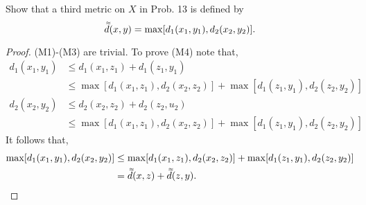 \documentclass[12pt]{article}
\newcommand{\dbtilde}[1]{\accentset{\approx}{#1}}
\newenvironment{exercise}[2][Exercise]{\begin{trivlist}
\item[\hskip \labelsep {\bfseries #1}\hskip \labelsep {\bfseries #2.}]}{\end{trivlist}}
\begin{document}
\begin{exercise}{1.2.15}
    Show that a third metric on $X$ in Prob. 13 is defined by
    \[ \dbtilde{d} (x, y) = \max [ d_1 (x_1, y_1), d_2 (x_2, y_2) ]. \]
\end{exercise}
\begin{proof}
    (M1)-(M3) are trivial. To prove (M4) note that,
    \begin{align*}
        d_1 (x_1, y_1) &\leq d_1 (x_1, z_1) + d_1 (z_1, y_1) \\
        &\leq \max [ d_1 (x_1, z_1), d_2 (x_2, z_2) ] + \max [ d_1 (z_1, y_1), d_2 (z_2, y_2) ] \\
        d_2 (x_2, y_2) &\leq d_2 (x_2, z_2) + d_2 (z_2, u_2) \\
        &\leq \max [ d_1 (x_1, z_1), d_2 (x_2, z_2) ] + \max [ d_1 (z_1, y_1), d_2 (z_2, y_2) ]
    \end{align*}
    It follows that,
    \begin{align*}
        \max [ d_1 (x_1, y_1), d_2 (x_2, y_2) ] &\leq \max [ d_1 (x_1, z_1), d_2 (x_2, z_2) ] + \max [ d_1 (z_1, y_1), d_2 (z_2, y_2) ] \\
        &= \dbtilde{d}(x, z) + \dbtilde{d} (z, y).
    \end{align*}

\end{proof}
\end{document}
